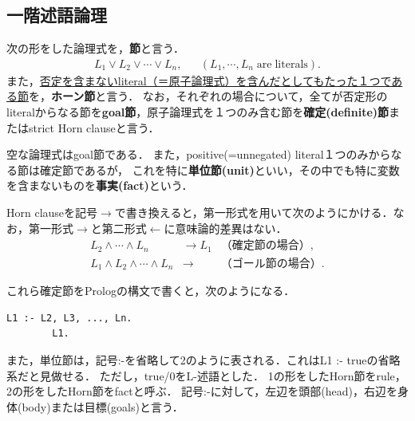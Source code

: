 \documentclass[uplatex, dvipdfmx]{jsreport}
\begin{document}
\begin{example}
    
\end{example}

\subsection{一階述語論理}

\begin{definition}
    次の形をした論理式を，\textbf{節}と言う．
    \begin{align*}
        L_1\lor L_2\lor\cdots\lor L_n, && (L_1,\cdots,L_n\mathrm{\;are\;literals}).
    \end{align*}
    また，\underline{否定を含まないliteral（＝原子論理式）を含んだとしてもたった１つである節}を，\textbf{ホーン節}と言う．
    なお，それぞれの場合について，全てが否定形のliteralからなる節を\textbf{goal節}，原子論理式を１つのみ含む節を\textbf{確定(definite)節}またはstrict Horn clauseと言う．
\end{definition}
\begin{example}
    空な論理式はgoal節である．
    また，positive(=unnegated) literal１つのみからなる節は確定節であるが，
    これを特に\textbf{単位節(unit)}といい，その中でも特に変数を含まないものを\textbf{事実(fact)}という．
\end{example}
\begin{remark}
    Horn clauseを記号$\to$で書き換えると，第一形式を用いて次のようにかける．なお，第一形式$\to$と第二形式$\leftarrow$に意味論的差異はない．
    \begin{align*}
        L_2\land\cdots\land L_n &\to L_1 &（確定節の場合）,\\
        L_1\land L_2\land\cdots\land L_n &\to &（ゴール節の場合）.
    \end{align*}
\end{remark}
\begin{remark}[Prologでは]
    これら確定節をPrologの構文で書くと，次のようになる．
    \begin{lstlisting}[caption=Prolog]
        L1 :- L2, L3, ..., Ln.
        L1.
    \end{lstlisting}
    また，単位節は，記号:-を省略して2のように表される．これはL1 :- trueの省略系だと見做せる．
    ただし，true/0をL-述語とした．
    1の形をしたHorn節をrule，2の形をしたHorn節をfactと呼ぶ．
    記号:-に対して，左辺を頭部(head)，右辺を身体(body)または目標(goals)と言う．
\end{remark}
\end{document}
